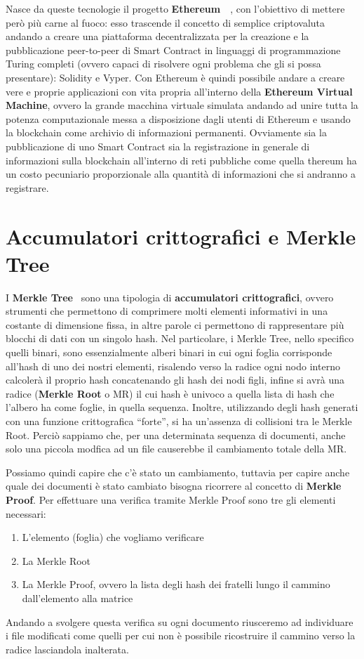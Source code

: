 \label{sub:eth}
Nasce da queste tecnologie il progetto \textbf{Ethereum}~\cite{eth-21}~\cite{eth-22}, con l’obiettivo di mettere però
più carne al fuoco: esso trascende il concetto di semplice criptovaluta andando a creare
una piattaforma decentralizzata per la creazione e la pubblicazione peer-to-peer di Smart Contract
in linguaggi di programmazione Turing completi (ovvero capaci di risolvere ogni problema
che gli si possa presentare): Solidity e Vyper.
Con Ethereum è quindi possibile andare a creare vere e proprie applicazioni
con vita propria all’interno della \textbf{Ethereum Virtual Machine},
ovvero la grande macchina virtuale simulata andando ad unire tutta la potenza computazionale
messa a disposizione dagli utenti di Ethereum e usando la blockchain come archivio di
informazioni permanenti. Ovviamente sia la pubblicazione di uno Smart Contract sia la registrazione
in generale di informazioni sulla blockchain all’interno di reti pubbliche come quella
thereum ha un costo pecuniario proporzionale alla quantità di informazioni che si andranno a registrare.

\section{Accumulatori crittografici e Merkle Tree}
\label{sub:mt}
I \textbf{Merkle Tree}~\cite{mertree} sono una tipologia di \textbf{accumulatori crittografici}, ovvero strumenti che permettono
di comprimere molti elementi informativi in una costante di dimensione fissa, in altre parole
ci permettono di rappresentare più blocchi di dati con un singolo hash.
Nel particolare, i Merkle Tree, nello specifico quelli binari, sono essenzialmente alberi binari
in cui ogni foglia corrisponde all’hash di uno dei nostri elementi, risalendo verso la radice ogni
nodo interno calcolerà il proprio hash concatenando gli hash dei nodi figli, infine si avrà
una radice (\textbf{Merkle Root} o MR) il cui hash è univoco a quella lista di hash che l’albero
ha come foglie, in quella sequenza.
Inoltre, utilizzando degli hash generati con una funzione crittografica “forte”, si ha
un’assenza di collisioni tra le Merkle Root.
Perciò sappiamo che, per una determinata sequenza di documenti, anche solo una
piccola modfica ad un file causerebbe il cambiamento totale della MR.

Possiamo quindi capire che c’è stato un cambiamento, tuttavia per capire anche
quale dei documenti è stato cambiato bisogna ricorrere al concetto di \textbf{Merkle Proof}.
Per effettuare una verifica tramite Merkle Proof sono tre gli elementi necessari:
\begin{enumerate}
    \item L’elemento (foglia) che vogliamo verificare
    \item La Merkle Root
    \item La Merkle Proof, ovvero la lista degli hash dei fratelli lungo il cammino dall’elemento alla matrice
\end{enumerate}
Andando a svolgere questa verifica su ogni documento riusceremo ad individuare i file modificati come
quelli per cui non è possibile ricostruire il cammino verso la radice lasciandola inalterata.

